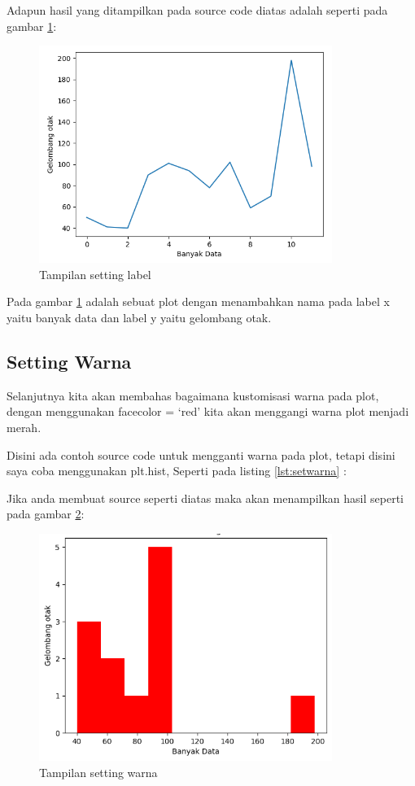 Adapun hasil yang ditampilkan pada source code diatas adalah seperti pada gambar \ref{fig:setlabel}:
\begin{figure}[!htbp]
	\centerline{\includegraphics[width=0.85\textwidth]{figures/6/setlabel.PNG}}
	\caption{Tampilan setting label}
	\label{fig:setlabel}
\end{figure} 

Pada gambar \ref{fig:setlabel} adalah sebuat plot dengan menambahkan nama pada label x yaitu banyak data dan label y yaitu gelombang otak.

\subsection{Setting Warna}
Selanjutnya kita akan membahas bagaimana kustomisasi warna pada plot, dengan menggunakan facecolor = ‘red’ kita akan menggangi warna plot menjadi merah.

Disini ada contoh source code untuk mengganti warna pada plot, tetapi disini saya coba menggunakan plt.hist, Seperti pada listing \ref{lst:setwarna} : 


Jika anda membuat source seperti diatas maka akan menampilkan hasil  seperti pada gambar \ref{fig:setwarna}:
\begin{figure}[!htbp]
	\centerline{\includegraphics[width=0.85\textwidth]{figures/6/setwarna.PNG}}
	\caption{Tampilan setting warna}
	\label{fig:setwarna}
\end{figure} 

